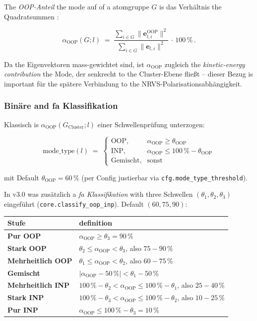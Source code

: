 \documentclass[11pt,a4paper,twoside]{article}
\newcommand{\evec}{\mathbf{e}}
\newcommand{\OOP}{\mathrm{OOP}}
\newcommand{\INP}{\mathrm{INP}}
\theoremstyle{remark}
\begin{document}
The \emph{OOP-Anteil} the mode auf of a atomgruppe $G$ is das
Verh\"altnis the Quadratsummen \cite{Gee2021}:

\begin{equation}
  \alpha_{\OOP}(G; l) \;=\;
  \frac{\sum_{i \in G} \lVert\evec_{l,i}^{\OOP}\rVert^2}
       {\sum_{i \in G} \lVert\evec_{l,i}\rVert^2} \,\cdot\, 100\,\%
  \,.
  \label{eq:oop-anteil}
\end{equation}

Da the Eigenvektoren mass-gewichtet sind, ist
$\alpha_{\OOP}$ zugleich the \emph{kinetic-energy contribution} the Mode,
der senkrecht to the Cluster-Ebene flie\ss t -- dieser Bezug is important
f\"ur the sp\"atere Verbindung to the NRVS-Polarisationsabh\"angigkeit.

\subsubsection*{Bin\"are and fa Klassifikation}

Klassisch is $\alpha_{\OOP}(G_{\text{Cluster}}; l)$ einer
Schwellenpr\"ufung unterzogen:

\begin{equation}
  \text{mode\_type}(l) \;=\;
  \begin{cases}
    \OOP, & \alpha_{\OOP} \geq \theta_{\text{OOP}} \\
    \INP, & \alpha_{\OOP} \leq 100\,\% - \theta_{\text{OOP}} \\
    \text{Gemischt}, & \text{sonst}
  \end{cases}
\end{equation}

mit Default $\theta_{\text{OOP}} = 60\,\%$ (per Config justierbar via
\texttt{cfg.mode\_type\_threshold}).

In v3.0 was zus\"atzlich a \emph{fa Klassifikation} with three
Schwellen $(\theta_1, \theta_2, \theta_3)$ eingef\"uhrt
(\texttt{core.classify\_oop\_inp}). Default $(60, 75, 90)$:

\begin{center}
\begin{tabularx}{\textwidth}{l X}
\toprule
\textbf{Stufe} & \textbf{definition} \\
\midrule
\textbf{Pur OOP}        & $\alpha_{\OOP} \geq \theta_3 = 90\,\%$ \\
\textbf{Stark OOP}      & $\theta_2 \leq \alpha_{\OOP} < \theta_3$, also $75-90\,\%$ \\
\textbf{Mehrheitlich OOP} & $\theta_1 \leq \alpha_{\OOP} < \theta_2$, also $60-75\,\%$ \\
\textbf{Gemischt}       & $|{\alpha_{\OOP} - 50\,\%}| < \theta_1 - 50\,\%$ \\
\textbf{Mehrheitlich INP} & $100\,\% - \theta_2 < \alpha_{\OOP} \leq 100\,\% - \theta_1$, also $25-40\,\%$ \\
\textbf{Stark INP}      & $100\,\% - \theta_3 < \alpha_{\OOP} \leq 100\,\% - \theta_2$, also $10-25\,\%$ \\
\textbf{Pur INP}        & $\alpha_{\OOP} \leq 100\,\% - \theta_3 = 10\,\%$ \\
\bottomrule
\end{tabularx}
\end{center}
\end{document}
